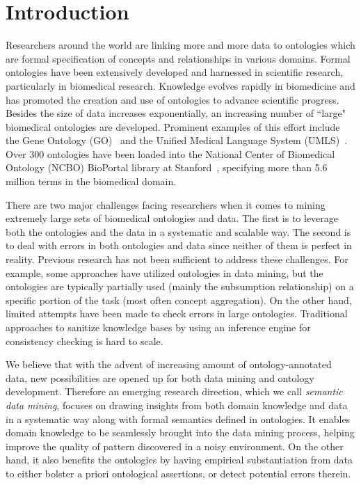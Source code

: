 \section{Introduction}
\label{sec:intro}

Researchers around the world are linking more and more data to ontologies which are formal specification of concepts and relationships in various domains. Formal ontologies have been extensively developed and harnessed in scientific research, particularly in biomedical research. Knowledge evolves rapidly in biomedicine and has promoted the creation and use of ontologies to advance scientific progress.  Besides the size of data increases exponentially, an increasing number of ``large" biomedical ontologies are developed. Prominent examples of this effort include the Gene Ontology (GO)~\cite{GO} and the Unified Medical Language System (UMLS)~\cite{UMLS}. Over 300 ontologies have been loaded into the National Center of Biomedical Ontology (NCBO) BioPortal library at Stanford~\cite{Noy2009}, specifying more than 5.6 million terms in the biomedical domain.

There are two major challenges facing researchers when it comes to mining extremely large sets of biomedical ontologies and data. The first is to leverage both the ontologies and the data in a systematic and scalable way. The second is to deal with errors in both ontologies and data since neither of them is perfect in reality. Previous research has not been sufficient to address these challenges. For example, some approaches have utilized ontologies in data mining, but the ontologies are typically partially used (mainly the subsumption relationship) on a specific portion of the task (most often concept aggregation). On the other hand, limited attempts have been made to check errors in large ontologies. Traditional approaches to sanitize knowledge bases by using an inference engine for consistency checking is hard to scale.

We believe that with the advent of increasing amount of ontology-annotated data, new possibilities are opened up for both data mining and ontology development. Therefore an emerging research direction, which we call \textit{semantic data mining}, focuses on drawing insights from both domain knowledge and data in a systematic way along with formal semantics defined in ontologies. It enables domain knowledge to be seamlessly brought into the data mining process, helping improve the quality of pattern discovered in a noisy environment. On the other hand, it also benefits the ontologies by having empirical substantiation from data to either bolster a priori ontological assertions, or detect potential errors therein.


